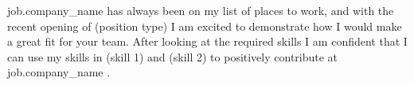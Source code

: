 {{job.company_name}} has always been on my list of places to work, and with the recent opening of (position type) I am excited to demonstrate how I would make a great fit for your team. After looking at the required skills I am confident that I can use my skills in (skill 1) and (skill 2) to positively contribute at {{job.company_name}} .
 
